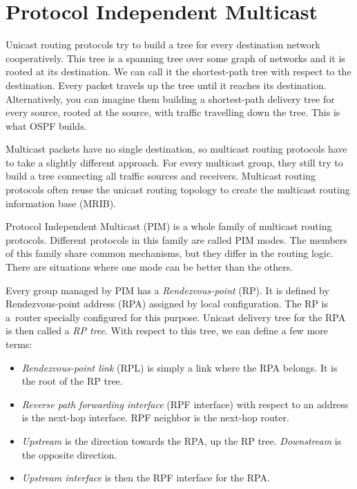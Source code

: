 \chapter{Protocol Independent Multicast}

Unicast routing protocols try to build a tree for every destination network
cooperatively. This tree is a spanning tree over some graph of networks and it
is rooted at its destination. We can call it the shortest-path tree with respect
to the destination. Every packet travels up the tree until it reaches its
destination. Alternatively, you can imagine them building a shortest-path
delivery tree for every source, rooted at the source, with traffic travelling
down the tree. This is what OSPF builds.

Multicast packets have no single destination, so multicast routing protocols
have to take a slightly different approach. For every multicast group, they still
try to build a tree connecting all traffic sources and receivers. Multicast
routing protocols often reuse the unicast routing topology to create the
multicast routing information base (MRIB).

Protocol Independent Multicast (PIM) is a whole family of multicast routing
protocols. Different protocols in this family are called PIM modes. The members of this
family share common mechanisms, but they differ in the routing logic. There are
situations where one mode can be better than the others.

Every group managed by PIM has a \emph{Rendezvous-point} (RP). It is defined by
Rendezvous-point address (RPA) assigned by local configuration. The RP is a~router
specially configured for this purpose. Unicast delivery tree for the RPA is then
called a \emph{RP tree}. With respect to this tree, we can define a few more terms:

\begin{itemize}
\item\emph{Rendezvous-point link} (RPL) is simply a link where the RPA belongs.
  It is the root of the RP tree.
\item\emph{Reverse path forwarding interface} (RPF interface) with respect to
  an address is the next-hop interface. RPF neighbor is the next-hop router.
\item\emph{Upstream} is the direction towards the RPA, up the RP tree.
  \emph{Downstream} is the opposite direction.
\item\emph{Upstream interface} is then the RPF interface for the RPA.
\end{itemize}

